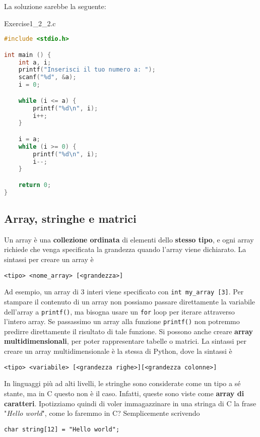 La soluzione sarebbe la seguente:
\pagebreak
\begin{codeblock}{Exercise1\_2\_2.c}
    \begin{lstlisting}[language = c]
#include <stdio.h>

int main () {
    int a, i;
    printf("Inserisci il tuo numero a: ");
    scanf("%d", &a);
    i = 0;

    while (i <= a) {
        printf("%d\n", i);
        i++;
    }

    i = a;
    while (i >= 0) {
        printf("%d\n", i);
        i--;
    }

    return 0;
}\end{lstlisting}
\end{codeblock}

\subsection{Array, stringhe e matrici}

Un array è una \textbf{collezione ordinata} di elementi dello \textbf{stesso tipo}, e ogni array richiede che venga specificata la grandezza quando l'array viene dichiarato. La sintassi per creare un array è 
\begin{center}
    \verb|<tipo> <nome_array> [<grandezza>]|
\end{center}

Ad esempio, un array di 3 interi viene specificato con \verb|int my_array [3]|. Per stampare il contenuto di un array non possiamo passare direttamente la variabile dell'array a \verb|printf()|, ma bisogna usare un \verb|for| loop per iterare attraverso l'intero array. Se passassimo un array alla funzione \verb|printf()| non potremmo predirre direttamente il risultato di tale funzione.
\nl
Si possono anche creare \textbf{array multidimensionali}, per poter rappresentare tabelle o matrici. La sintassi per creare un array multidimensionale è la stessa di Python, dove la sintassi è
\begin{center}
    \verb|<tipo> <variabile> [<grandezza righe>][<grandezza colonne>]|
\end{center}

In linguaggi più ad alti livelli, le stringhe sono considerate come un tipo a sé stante, ma in C questo non è il caso. Infatti, queste sono viste come \textbf{array di caratteri}. Ipotizziamo quindi di voler immagazzinare in una stringa di C la frase "\textit{Hello world}", come lo faremmo in C? Semplicemente scrivendo
\begin{center}
    \verb|char string[12] = "Hello world";|
\end{center}

